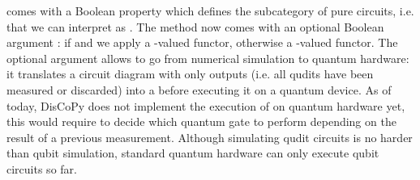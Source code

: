  comes with a Boolean property  which defines the subcategory of pure circuits, i.e. that we can interpret as .
The  method now comes with an optional Boolean argument : if  and  we apply a -valued functor, otherwise a -valued functor.
The optional  argument allows to go from numerical simulation to quantum hardware: it translates a circuit diagram with only  outputs (i.e. all qudits have been measured or discarded) into a  before executing it on a quantum device.
As of today, DisCoPy does not implement the execution of  on quantum hardware yet, this would require to decide which quantum gate to perform depending on the result of a previous measurement.
Although simulating qudit circuits is no harder than qubit simulation, standard quantum hardware can only execute qubit circuits so far.

